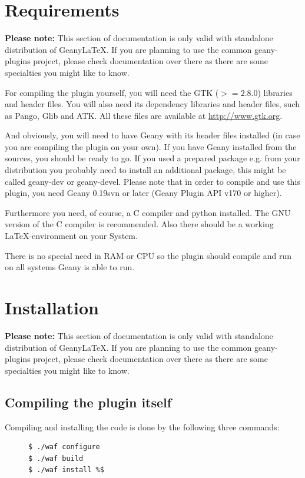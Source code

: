 \documentclass[%
a4paper,%
10pt,%
oneside,%
DIV18,
headsepline,
plainheadsepline,
footsepline,
plainfootsepline,
bibtotoc,%
liststotoc,%
BCOR12mm,%
halfparskip,%
openany,%
]{scrartcl}
\begin{document}
\newpage
\section{Requirements}

\small{\textbf{Please note:} This section of documentation is only
valid with standalone distribution of Geany\LaTeX{}. If you are
planning to use the common geany-plugins project, please check
documentation over there as there are some specialties you might
like to know.}

For compiling the plugin yourself, you will need the GTK ($>= 2.8.0$)
libraries and header files. You will also need its dependency
libraries and header files, such as Pango, Glib and ATK. All these
files are available at \url{http://www.gtk.org}.

And obviously, you will need to have Geany with its header files
installed (in case you are compiling the plugin on your own). If you
have Geany installed from the sources, you should be ready to go. If
you used a prepared package e.g. from your distribution you probably
need to install an additional package, this might be called geany-dev
or geany-devel. Please note that in order to compile and use this
plugin, you need Geany 0.19svn or later (Geany Plugin API v170 or higher).

Furthermore you need, of course, a C compiler and python installed. The
GNU version of the C compiler is recommended. Also there should be a
working \LaTeX-environment on your System.

There is no special need in RAM or CPU so the plugin should compile and
run on all systems Geany is able to run.

\section{Installation}

\small{\textbf{Please note:} This section of documentation is only
valid with standalone distribution of Geany\LaTeX{}. If you are
planning to use the common geany-plugins project, please check
documentation over there as there are some specialties you might
like to know.}

\subsection{Compiling the plugin itself}
Compiling and installing the code is done by the following three
commands:

\begin{figure}[h!]
\begin{lstlisting}
$ ./waf configure
$ ./waf build
$ ./waf install %$
\end{lstlisting}
\end{figure}
\end{document}
